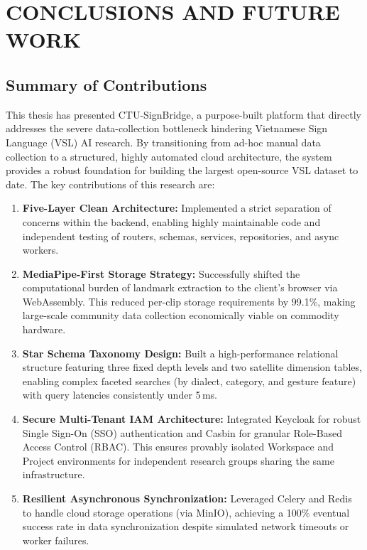 \chapter{CONCLUSIONS AND FUTURE WORK}

\section{Summary of Contributions}

This thesis has presented CTU-SignBridge, a purpose-built platform that directly addresses the severe data-collection bottleneck hindering Vietnamese Sign Language (VSL) AI research. By transitioning from ad-hoc manual data collection to a structured, highly automated cloud architecture, the system provides a robust foundation for building the largest open-source VSL dataset to date. The key contributions of this research are:

\begin{enumerate}
    \item \textbf{Five-Layer Clean Architecture:} Implemented a strict separation of concerns within the backend, enabling highly maintainable code and independent testing of routers, schemas, services, repositories, and async workers.
    \item \textbf{MediaPipe-First Storage Strategy:} Successfully shifted the computational burden of landmark extraction to the client's browser via WebAssembly. This reduced per-clip storage requirements by 99.1\%, making large-scale community data collection economically viable on commodity hardware.
    \item \textbf{Star Schema Taxonomy Design:} Built a high-performance relational structure featuring three fixed depth levels and two satellite dimension tables, enabling complex faceted searches (by dialect, category, and gesture feature) with query latencies consistently under 5\,ms.
    \item \textbf{Secure Multi-Tenant IAM Architecture:} Integrated Keycloak for robust Single Sign-On (SSO) authentication and Casbin for granular Role-Based Access Control (RBAC). This ensures provably isolated Workspace and Project environments for independent research groups sharing the same infrastructure.
    \item \textbf{Resilient Asynchronous Synchronization:} Leveraged Celery and Redis to handle cloud storage operations (via MinIO), achieving a 100\% eventual success rate in data synchronization despite simulated network timeouts or worker failures.
\end{enumerate}

